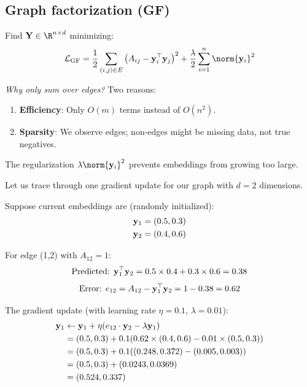 \begin{notechapter}
\subsection{Graph factorization (GF)}

\begin{definition}
Find $\embed \in \R^{n \times d}$ minimizing:
\[
\mathcal{L}_{\text{GF}} = \frac{1}{2} \sum_{(i,j) \in E} \left(A_{ij} - \vect{y}_i^\top \vect{y}_j\right)^2 + \frac{\lambda}{2} \sum_{i=1}^{n} \norm{\vect{y}_i}^2
\]
\end{definition}

\begin{intuition}
\emph{Why only sum over edges?} Two reasons:
\begin{enumerate}
    \item \textbf{Efficiency}: Only $O(m)$ terms instead of $O(n^2)$.
    \item \textbf{Sparsity}: We observe edges; non-edges might be missing data, not true negatives.
\end{enumerate}
The regularization $\lambda \norm{\vect{y}_i}^2$ prevents embeddings from growing too large.
\end{intuition}

\begin{example}
Let us trace through one gradient update for our graph with $d=2$ dimensions.

Suppose current embeddings are (randomly initialized):
\begin{align*}
\mathbf{y}_1 &= (0.5, 0.3) \\
\mathbf{y}_2 &= (0.4, 0.6)
\end{align*}

For edge (1,2) with $A_{12} = 1$:
\[
\text{Predicted: } \mathbf{y}_1^\top \mathbf{y}_2 = 0.5 \times 0.4 + 0.3 \times 0.6 = 0.38
\]
\[
\text{Error: } e_{12} = A_{12} - \mathbf{y}_1^\top \mathbf{y}_2 = 1 - 0.38 = 0.62
\]

The gradient update (with learning rate $\eta = 0.1$, $\lambda = 0.01$):
\begin{align*}
\mathbf{y}_1 &\leftarrow \mathbf{y}_1 + \eta(e_{12} \cdot \mathbf{y}_2 - \lambda \mathbf{y}_1) \\
&= (0.5, 0.3) + 0.1(0.62 \times (0.4, 0.6) - 0.01 \times (0.5, 0.3)) \\
&= (0.5, 0.3) + 0.1((0.248, 0.372) - (0.005, 0.003)) \\
&= (0.5, 0.3) + (0.0243, 0.0369) \\
&= (0.524, 0.337)
\end{align*}


\end{example}
\end{notechapter}
